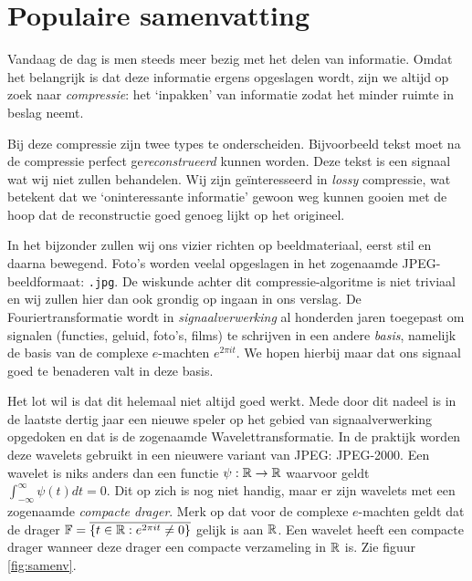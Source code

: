 \chapter{Populaire samenvatting}

Vandaag de dag is men steeds meer bezig met het delen van informatie. Omdat het belangrijk is dat deze informatie ergens opgeslagen wordt, zijn we altijd op zoek naar \emph{compressie}: het `inpakken' van informatie zodat het minder ruimte in beslag neemt.

Bij deze compressie zijn twee types te onderscheiden. Bijvoorbeeld tekst moet na de compressie perfect ge\emph{reconstrueerd} kunnen worden. Deze tekst is een signaal wat wij niet zullen behandelen. Wij zijn ge\"interesseerd in \emph{lossy} compressie, wat betekent dat we `oninteressante informatie' gewoon weg kunnen gooien met de hoop dat de reconstructie goed genoeg lijkt op het origineel.

In het bijzonder zullen wij ons vizier richten op beeldmateriaal, eerst stil en daarna bewegend. Foto's worden veelal opgeslagen in het zogenaamde JPEG-beeldformaat: \texttt{.jpg}. De wiskunde achter dit compressie-algoritme is niet triviaal en wij zullen hier dan ook grondig op ingaan in ons verslag. De Fouriertransformatie wordt in \emph{signaalverwerking} al honderden jaren toegepast om signalen (functies, geluid, foto's, films) te schrijven in een andere \emph{basis}, namelijk de basis van de complexe $e$-machten $e^{2 \pi i t}$. We hopen hierbij maar dat ons signaal goed te benaderen valt in deze basis.

Het lot wil is dat dit helemaal niet altijd goed werkt. Mede door dit nadeel is in de laatste dertig jaar een nieuwe speler op het gebied van signaalverwerking opgedoken en dat is de zogenaamde Wavelettransformatie. In de praktijk worden deze wavelets gebruikt in een nieuwere variant van JPEG: JPEG-2000. Een wavelet is niks anders dan een functie $\psi: \mathbb{R} \to \mathbb{R}$ waarvoor geldt $\int_{-\infty}^\infty \psi(t) dt = 0$. Dit op zich is nog niet handig, maar er zijn wavelets met een zogenaamde \emph{compacte drager}. Merk op dat voor de complexe $e$-machten geldt dat de drager $\mathbb{F} = \overline{\{ t \in \mathbb{R}: e^{2 \pi i t} \not= 0 \}}$ gelijk is aan $\mathbb{R}$. Een wavelet heeft een compacte drager wanneer deze drager een compacte verzameling in $\mathbb{R}$ is. Zie figuur \ref{fig:samenv}.

